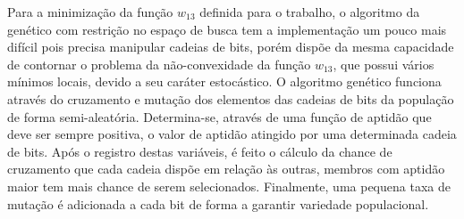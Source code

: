 Para a minimização da função $w_{13}$ definida para o trabalho, o algoritmo da genético com restrição no espaço de busca tem a implementação um pouco mais difícil pois precisa manipular cadeias de bits, porém dispõe da mesma capacidade de contornar o problema da não-convexidade da função $w_{13}$, que possui vários mínimos locais, devido a seu caráter estocástico. O algoritmo genético funciona através do cruzamento e mutação dos elementos das cadeias de bits da população de forma semi-aleatória. Determina-se, através de uma função de aptidão que deve ser sempre positiva, o valor de aptidão atingido por uma determinada cadeia de bits. Após o registro destas variáveis, é feito o cálculo da chance de cruzamento que cada cadeia dispõe em relação às outras, membros com aptidão maior tem mais chance de serem selecionados. Finalmente, uma pequena taxa de mutação é adicionada a cada bit de forma a garantir variedade populacional. 